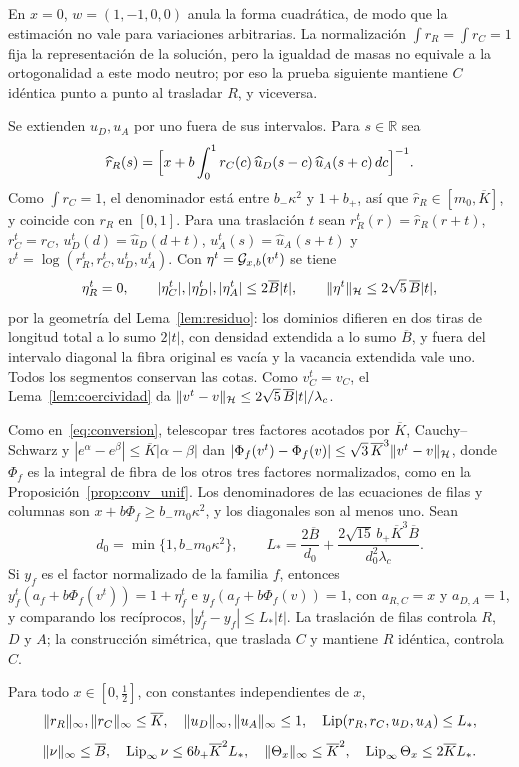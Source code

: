 En $x=0$, $w=(1,-1,0,0)$ anula la forma cuadrática, de modo que la estimación no vale para variaciones
arbitrarias. La normalización $\int r_R=\int r_C=1$ fija la representación de la solución, pero la
igualdad de masas no equivale a la ortogonalidad a este modo neutro; por eso la prueba siguiente
mantiene $C$ idéntica punto a punto al trasladar $R$, y viceversa.

Se extienden $u_D,u_A$ por uno fuera de sus intervalos. Para $s\in\mathbb R$ sea
\[
 \widehat r_R(s)=\Bigl[x+b\int_0^1r_C(c)\,\widehat u_D(s-c)\,\widehat u_A(s+c)\,dc\Bigr]^{-1}.
\]
Como $\int r_C=1$, el denominador está entre $b_-\kappa^2$ y $1+b_+$, así que
$\widehat r_R\in[m_0,\overline K]$, y coincide con $r_R$ en $[0,1]$. Para una traslación $t$ sean
$r_R^t(r)=\widehat r_R(r+t)$, $r_C^t=r_C$, $u_D^t(d)=\widehat u_D(d+t)$, $u_A^t(s)=\widehat u_A(s+t)$ y
$v^t=\log(r_R^t,r_C^t,u_D^t,u_A^t)$. Con $\eta^t={\mathcal{G}}_{x,b}(v^t)$ se tiene
\[
 \eta_R^t=0,\qquad |\eta_C^t|,|\eta_D^t|,|\eta_A^t|\le2\overline B|t|,\qquad \|\eta^t\|_{\mathcal{H}}\le2\sqrt5\,\overline B|t| ,
\]
por la geometría del Lema~\ref{lem:residuo}: los dominios difieren en dos tiras de longitud total a lo
sumo $2|t|$, con densidad extendida a lo sumo $\overline B$, y fuera del intervalo diagonal la fibra
original es vacía y la vacancia extendida vale uno. Todos los segmentos conservan las cotas. Como
$v_C^t=v_C$, el Lema~\ref{lem:coercividad} da $\|v^t-v\|_{\mathcal{H}}\le2\sqrt5\,\overline B|t|/\lambda_c$.

Como en~\eqref{eq:conversion}, telescopar tres factores acotados por $\overline K$, Cauchy--Schwarz y
$|e^\alpha-e^\beta|\le\overline K|\alpha-\beta|$ dan $|\Phi_f(v^t)-\Phi_f(v)|\le\sqrt3\,\overline K^3\|v^t-v\|_{\mathcal{H}}$,
donde $\Phi_f$ es la integral de fibra de los otros tres factores normalizados, como en la
Proposición~\ref{prop:conv_unif}. Los denominadores de las ecuaciones de
filas y columnas son $x+b\Phi_f\ge b_-m_0\kappa^2$, y los diagonales son al menos uno. Sean
\[
 d_0=\min\{1,b_-m_0\kappa^2\},\qquad
 L_*=\frac{2\overline B}{d_0}+\frac{2\sqrt{15}\,b_+\overline K^3\overline B}{d_0^2\lambda_c}.
\]
Si $y_f$ es el factor normalizado de la familia $f$, entonces $y_f^t(a_f+b\Phi_f(v^t))=1+\eta_f^t$ e
$y_f(a_f+b\Phi_f(v))=1$, con $a_{R,C}=x$ y $a_{D,A}=1$, y comparando los recíprocos,
$|y_f^t-y_f|\le L_*|t|$. La traslación de filas controla $R$, $D$ y $A$; la construcción simétrica, que
traslada $C$ y mantiene $R$ idéntica, controla $C$.

\begin{teorema}\label{thm:lip_uniforme}
Para todo $x\in[0,\frac12]$, con constantes independientes de $x$,
\[
 \|r_R\|_\infty,\|r_C\|_\infty\le\overline K,\quad \|u_D\|_\infty,\|u_A\|_\infty\le1,\quad
 \operatorname{Lip}(r_R,r_C,u_D,u_A)\le L_*,
\]
\[
 \|\nu\|_\infty\le\overline B,\quad \operatorname{Lip}_\infty\nu\le6b_+\overline K^2L_*,\quad
 \|\Theta_x\|_\infty\le\overline K^2,\quad \operatorname{Lip}_\infty\Theta_x\le2\overline KL_* .
\]
\end{teorema}

